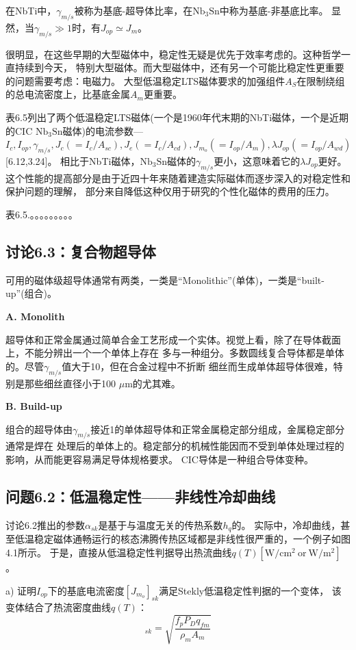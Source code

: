 在NbTi中，$\gamma_{m/s}$被称为基底-超导体比率，在$\mathrm{Nb_3Sn}$中称为基底-非基底比率。
显然，当$\gamma_{m/s}\gg 1$时，有$J_{op}\simeq J_m$。

很明显，在这些早期的大型磁体中，稳定性无疑是优先于效率考虑的。这种哲学一直持续到今天，
特别大型磁体。而大型磁体中，还有另一个可能比稳定性更重要的问题需要考虑：电磁力。
大型低温稳定LTS磁体要求的加强组件$A_S$在限制绕组的总电流密度上，比基底金属$A_m$更重要。

表6.5列出了两个低温稳定LTS磁体(一个是1960年代末期的NbTi磁体，一个是近期的CIC $\mathrm{Nb_3Sn}$磁体)的电流参数---$I_c,I_{op},\gamma_{m/s},J_c(=I_c/A_{sc}),J_e(=I_c/A_{cd}),
J_{m_o}(=I_{op}/A_m),\lambda J_{op}(=I_{op}/A_{wd})$[6.12,3.24]。
相比于NbTi磁体，$\mathrm{Nb_3Sn}$磁体的$\gamma_{m/s}$更小，这意味着它的$\lambda J_{op}$更好。
这个性能的提高部分是由于近四十年来随着建造实际磁体而逐步深入的对稳定性和保护问题的理解，
部分来自降低这种仅用于研究的个性化磁体的费用的压力。

表6.5.。。。。。。。。。

\subsection{讨论6.3：复合物超导体}
可用的磁体级超导体通常有两类，一类是“Monolithic”(单体)，一类是“built-up”(组合)。

\textbf{A. Monolith}

超导体和正常金属通过简单合金工艺形成一个实体。视觉上看，除了在导体截面上，不能分辨出一个一个单体上存在
多与一种组分。多数圆线复合导体都是单体的。尽管$\gamma_{m/s}$值大于10，但在合金过程中不折断
细丝而生成单体超导体很难，特别是那些细丝直径小于100 $\mu$m的尤其难。

\textbf{B. Build-up}

组合的超导体由$\gamma_{m/s}$接近1的单体超导体和正常金属稳定部分组成，金属稳定部分通常是焊在
处理后的单体上的。稳定部分的机械性能因而不受到单体处理过程的影响，从而能更容易满足导体规格要求。
CIC导体是一种组合导体变种。

\subsection{问题6.2：低温稳定性——非线性冷却曲线}
讨论6.2推出的参数$\alpha_{sk}$是基于与温度无关的传热系数$h_q$的。
实际中，冷却曲线，甚至低温稳定磁体通畅运行的核态沸腾传热区域都是非线性很严重的，一个例子如图4.1所示。
于是，直接从低温稳定性判据导出热流曲线$q(T)[\mathrm{W/cm^2\ or\ W/m^2}] $。

a) 证明$I_{op}$下的基底电流密度$[J_{m_o}]_{sk}$满足Stekly低温稳定性判据的一个变体，
该变体结合了热流密度曲线$q(T)$：
\begin{equation}%
[J_{m_o}]_{sk}=\sqrt{\frac{f_pP_Dq_{fm}}{\rho_mA_m}}
\end{equation}

